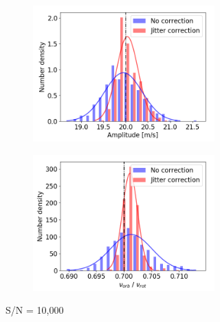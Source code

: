 \begin{figure}[tbp]	
    \begin{subfigure}[b]{1.0\textwidth}
    		\begin{subfigure}[b]{0.49\textwidth}
        		\includegraphics[width=\textwidth]{./Figures/Methods/Histogram_new1_p20_sn10000.png}
        \end{subfigure}
        \begin{subfigure}[b]{0.49\textwidth}
        		\includegraphics[width=\textwidth]{./Figures/Methods/Histogram_new2_p20_sn10000.png}
        \end{subfigure}
        \caption{S/N = 10,000}
    \end{subfigure}
    \begin{subfigure}[b]{1.0\textwidth}

\end{subfigure}
\end{figure}
